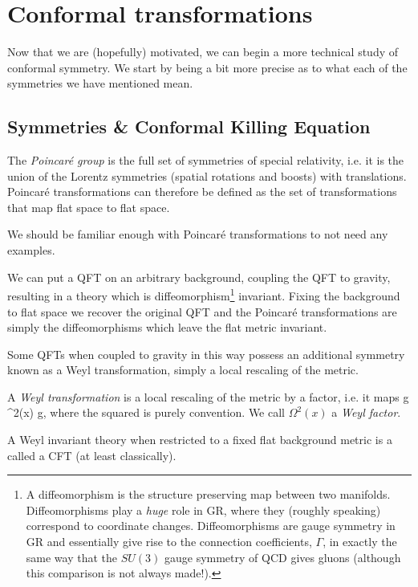 \chapter{Conformal transformations}

Now that we are (hopefully) motivated, we can begin a more technical study of conformal symmetry. We start by being a bit more precise as to what each of the symmetries we have mentioned mean. 

\section{Symmetries \& Conformal Killing Equation}

\bd
    The \textit{Poincar\'{e} group} is the full set of symmetries of special relativity, i.e. it is the union of the Lorentz symmetries (spatial rotations and boosts) with translations. Poincar\'{e} transformations can therefore be defined as the set of transformations that map flat space to flat space. 
\ed

We should be familiar enough with Poincar\'{e} transformations to not need any examples.

We can put a QFT on an arbitrary background, coupling the QFT to gravity, resulting in a theory which is diffeomorphism\footnote{A diffeomorphism is the structure preserving map between two manifolds. Diffeomorphisms play a \textit{huge} role in GR, where they (roughly speaking) correspond to coordinate changes. Diffeomorphisms are  gauge symmetry in GR and essentially give rise to the connection coefficients, $\Gamma$, in exactly the same way that the $SU(3)$ gauge symmetry of QCD gives gluons (although this comparison is not always made!).} invariant. Fixing the background to flat space we recover the original QFT and the  Poincar\'{e} transformations are simply the diffeomorphisms which leave the flat metric invariant.

Some QFTs when coupled to gravity in this way possess an additional symmetry known as a Weyl transformation, simply a local rescaling of the metric.

\bd
    A \textit{Weyl transformation} is a local rescaling of the metric by a factor, i.e. it maps 
    \bse 
        g \mapsto \Omega^2(x) g,
    \ese 
    where the squared is purely convention. We call $\Omega^2(x)$ a \textit{Weyl factor}.
\ed 

A Weyl invariant theory when restricted to a fixed flat background metric is a called a CFT (at least classically).

